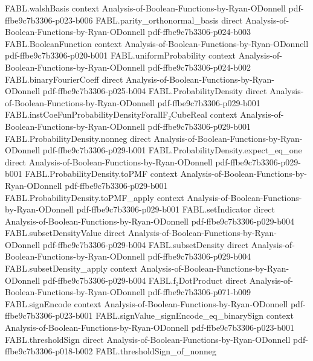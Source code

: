 \begin{theorem}
\proofstep
  {FABL.walshBasis}
  {context}
  {Analysis-of-Boolean-Functions-by-Ryan-ODonnell}
  {pdf-ffbe9c7b3306-p023-b006}
\proofstep
  {FABL.parity_orthonormal_basis}
  {direct}
  {Analysis-of-Boolean-Functions-by-Ryan-ODonnell}
  {pdf-ffbe9c7b3306-p024-b003}
\proofstep
  {FABL.BooleanFunction}
  {context}
  {Analysis-of-Boolean-Functions-by-Ryan-ODonnell}
  {pdf-ffbe9c7b3306-p020-b001}
\proofstep
  {FABL.uniformProbability}
  {context}
  {Analysis-of-Boolean-Functions-by-Ryan-ODonnell}
  {pdf-ffbe9c7b3306-p024-b002}
\proofstep
  {FABL.binaryFourierCoeff}
  {direct}
  {Analysis-of-Boolean-Functions-by-Ryan-ODonnell}
  {pdf-ffbe9c7b3306-p025-b004}
\proofstep
  {FABL.ProbabilityDensity}
  {direct}
  {Analysis-of-Boolean-Functions-by-Ryan-ODonnell}
  {pdf-ffbe9c7b3306-p029-b001}
\proofstep
  {FABL.instCoeFunProbabilityDensityForallF₂CubeReal}
  {context}
  {Analysis-of-Boolean-Functions-by-Ryan-ODonnell}
  {pdf-ffbe9c7b3306-p029-b001}
\proofstep
  {FABL.ProbabilityDensity.nonneg}
  {direct}
  {Analysis-of-Boolean-Functions-by-Ryan-ODonnell}
  {pdf-ffbe9c7b3306-p029-b001}
\proofstep
  {FABL.ProbabilityDensity.expect_eq_one}
  {direct}
  {Analysis-of-Boolean-Functions-by-Ryan-ODonnell}
  {pdf-ffbe9c7b3306-p029-b001}
\proofstep
  {FABL.ProbabilityDensity.toPMF}
  {context}
  {Analysis-of-Boolean-Functions-by-Ryan-ODonnell}
  {pdf-ffbe9c7b3306-p029-b001}
\proofstep
  {FABL.ProbabilityDensity.toPMF_apply}
  {context}
  {Analysis-of-Boolean-Functions-by-Ryan-ODonnell}
  {pdf-ffbe9c7b3306-p029-b001}
\proofstep
  {FABL.setIndicator}
  {direct}
  {Analysis-of-Boolean-Functions-by-Ryan-ODonnell}
  {pdf-ffbe9c7b3306-p029-b004}
\proofstep
  {FABL.subsetDensityValue}
  {direct}
  {Analysis-of-Boolean-Functions-by-Ryan-ODonnell}
  {pdf-ffbe9c7b3306-p029-b004}
\proofstep
  {FABL.subsetDensity}
  {direct}
  {Analysis-of-Boolean-Functions-by-Ryan-ODonnell}
  {pdf-ffbe9c7b3306-p029-b004}
\proofstep
  {FABL.subsetDensity_apply}
  {context}
  {Analysis-of-Boolean-Functions-by-Ryan-ODonnell}
  {pdf-ffbe9c7b3306-p029-b004}
\proofstep
  {FABL.f₂DotProduct}
  {direct}
  {Analysis-of-Boolean-Functions-by-Ryan-ODonnell}
  {pdf-ffbe9c7b3306-p071-b009}
\proofstep
  {FABL.signEncode}
  {context}
  {Analysis-of-Boolean-Functions-by-Ryan-ODonnell}
  {pdf-ffbe9c7b3306-p023-b001}
\proofstep
  {FABL.signValue_signEncode_eq_binarySign}
  {context}
  {Analysis-of-Boolean-Functions-by-Ryan-ODonnell}
  {pdf-ffbe9c7b3306-p023-b001}
\proofstep
  {FABL.thresholdSign}
  {direct}
  {Analysis-of-Boolean-Functions-by-Ryan-ODonnell}
  {pdf-ffbe9c7b3306-p018-b002}
\proofstep
  {FABL.thresholdSign_of_nonneg}

\end{theorem}
